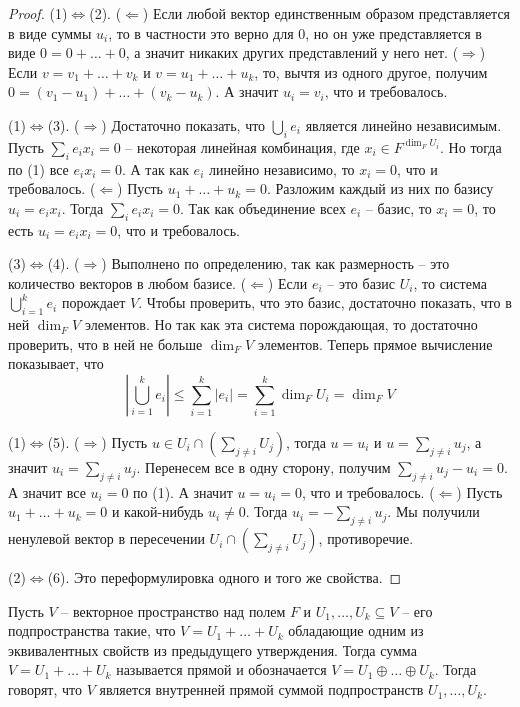 \begin{proof}
(1)$\Leftrightarrow$(2).
($\Leftarrow$) Если любой вектор единственным образом представляется в виде суммы $u_i$, то в частности это верно для $0$, но он уже представляется в виде $0 = 0 + \ldots + 0$, а значит никаких других представлений у него нет.
($\Rightarrow$) Если $v = v_1 + \ldots + v_k$ и $v = u_1 + \ldots + u_k$, то, вычтя из одного другое, получим $0 = (v_1 - u_1) + \ldots + (v_k - u_k)$.
А значит $u_i = v_i$, что и требовалось.

(1)$\Leftrightarrow$(3).
($\Rightarrow$) Достаточно показать, что $\bigcup_i e_i$ является линейно независимым.
Пусть $\sum_i e_i x_i = 0$ -- некоторая линейная комбинация, где $x_i\in F^{\dim_F U_i}$.
Но тогда по (1) все $e_i x_i = 0$.
А так как $e_i$ линейно независимо, то $x_i = 0$, что и требовалось.
($\Leftarrow$) Пусть $u_1 + \ldots + u_k = 0$.
Разложим каждый из них по базису $u_i = e_i x_i$.
Тогда $\sum_i e_i x_i = 0$.
Так как объединение всех $e_i$ -- базис, то $x_i = 0$, то есть $u_i = e_i x_i = 0$, что и требовалось.

(3)$\Leftrightarrow$(4).
($\Rightarrow$) Выполнено по определению, так как размерность -- это количество векторов в любом базисе.
($\Leftarrow$) Если $e_i$ -- это базис $U_i$, то система $\bigcup_{i=1}^k e_i$ порождает $V$.
Чтобы проверить, что это базис, достаточно показать, что в ней $\dim_F V$ элементов.
Но так как эта система порождающая, то достаточно проверить, что в ней не больше $\dim_F V$ элементов.
Теперь прямое вычисление показывает, что
\[
|\bigcup_{i=1}^k e_i|\leqslant \sum_{i=1}^k |e_i| = \sum_{i=1}^k \dim_F U_i = \dim_F V
\]

(1)$\Leftrightarrow$(5).
($\Rightarrow$) Пусть $u\in U_i\cap (\sum_{j\neq i} U_j)$, тогда $u = u_i$ и $u = \sum_{j\neq i} u_j$, а значит $u_i = \sum_{j\neq i} u _j$.
Перенесем все в одну сторону, получим $\sum_{j\neq i} u _j - u_i = 0$.
А значит все $u_i = 0$ по (1).
А значит $u = u_i = 0$, что и требовалось.
($\Leftarrow$) Пусть $u_1 + \ldots + u_k = 0$ и какой-нибудь $u_i\neq 0$.
Тогда $u_i = - \sum_{j\neq i}u_j$.
Мы получили ненулевой вектор в пересечении $U_i \cap (\sum_{j\neq i}U_j)$, противоречие.

(2)$\Leftrightarrow$(6).
Это переформулировка одного и того же свойства.

\end{proof}

\begin{definition}
Пусть $V$ -- векторное пространство над полем $F$ и $U_1,\ldots,U_k \subseteq V$ -- его подпространства такие, что $V = U_1+\ldots + U_k$ обладающие одним из эквивалентных свойств из предыдущего утверждения.
Тогда сумма $V = U_1+\ldots + U_k$  называется прямой и обозначается $V = U_1\oplus\ldots\oplus U_k$.
Тогда говорят, что $V$ является внутренней прямой суммой подпространств $U_1,\ldots,U_k$.
\end{definition}

